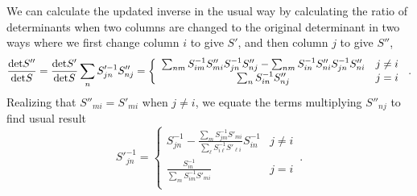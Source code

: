 \documentclass[12pt]{article}
\begin{document}
We can calculate the updated inverse in the usual way by calculating the
ratio of determinants when two columns are changed to the original
determinant in two ways where we first change column $i$ to give $S'$,
and then column $j$ to give $S''$,
\begin{equation}
\frac{{\rm det} S''}{{\rm det} S} = \frac{{\rm \det}S'}{{\rm det}S}
\sum_n S'^{-1}_{jn}S''_{nj} =
\left \{
\begin{array}{cc}
\sum_{nm} S^{-1}_{im} S''_{mi} S^{-1}_{jn} S''_{nj}
-\sum_{nm} S^{-1}_{in} S''_{ni} S^{-1}_{jn} S''_{ni} & j \ne i\\
\sum_n S^{-1}_{in} S''_{nj} & j = i\\
\end{array}
\right . \,.
\end{equation}
Realizing that $S''_{mi} = S'_{mi}$ when $j \ne i$, we equate
the terms multiplying $S''_{nj}$ to find usual result
\begin{equation}
S'^{-1}_{jn} = \left \{
\begin{array}{cc}
S^{-1}_{jn} -\frac{\sum_m S^{-1}_{jm}S'_{mi}}{\sum_\ell S^{-1}_{i\ell}
S'_{\ell i}} S^{-1}_{in}  & j \ne i\\
\frac{S^{-1}_{in}}{\sum_m S^{-1}_{im}S'_{mi}} & j = i\\
\end{array}
\right . \,.
\end{equation}
\end{document}
